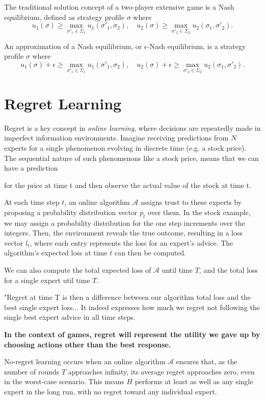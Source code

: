 \documentclass{article}
\begin{document}
The traditional solution concept of a two-player extensive game is a Nash equilibrium, defined as strategy profile \(\sigma\) where 
\[
u_1(\sigma) \geq \max_{\sigma'_1 \in \Sigma_1} u_1(\sigma'_1, \sigma_2), \quad
u_2(\sigma) \geq \max_{\sigma'_2 \in \Sigma_2} u_2(\sigma_1, \sigma'_2).
\]

An approximation of a Nash equilibrium, or \(\epsilon\)-Nash equilibrium, is a strategy profile \(\sigma\) where 
\[
u_1(\sigma) + \epsilon \geq \max_{\sigma'_1 \in \Sigma_1} u_1(\sigma'_1, \sigma_2), \quad
u_2(\sigma) + \epsilon \geq \max_{\sigma'_2 \in \Sigma_2} u_2(\sigma_1, \sigma'_2).
\]




\section{Regret Learning}

Regret is a key concept in \textit{online learning}, where decisions are repeatedly made in imperfect information environments. Imagine receiving predictions from \( N \) experts for a single phenomenon evolving in discrete time (e.g. a stock price). The sequential nature of such phenomenons like a stock price, means that we can have a prediction

for the price at time t and then observe the actual value of the stock at time t. 

At each time step \( t \), an online algorithm \( \mathcal{A} \) assigns trust to these experts by proposing a probability distribution vector \( p_t \) over them. In the stock example, we may assign a probability distribution for the one step increments over the integers. 
Then, the environment reveals the true outcome, resulting in a loss vector \( l_t \), where each entry represents the loss for an expert's advice. The algorithm's expected loss at time $t$ can then be computed.

We can also compute the total expected loss of $\mathcal{A}$ until time $T$, and the total loss for a single expert util time $T$.

"Regret at time T is then a difference between our algorithm total loss and the best single expert loss... It indeed expresses how much we regret not following the single best expert advice in all time steps.

\textbf{In the context of games, regret will represent the utility we gave up by choosing actions other than the best response.}   

No-regret learning occurs when an online algorithm \( \mathcal{A} \) ensures that, as the number of rounds \( T \) approaches infinity, its average regret approaches zero, even in the worst-case scenario. This means \( H \) performs at least as well as any single expert in the long run, with no regret toward any individual expert.
\end{document}
